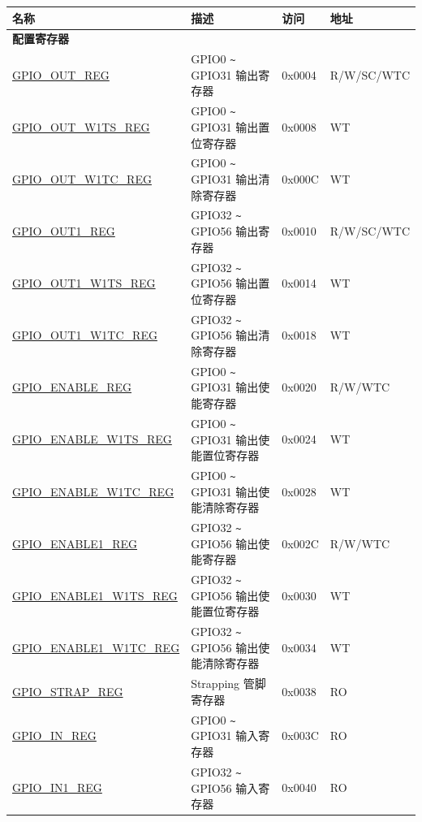 \begin{longtable}{ | p{5.8cm} | p{7.2cm} | p{1.3cm} | p{2.2cm} | }
\hline\rowcolor{lightgray}
\textbf{名称} & \textbf{描述} &  \textbf{访问} & \textbf{地址} \\ \hline
\endhead
\multicolumn{4}{|l|}{\textbf{配置寄存器}} \\ \hline
\hyperref[regdesc:GPIOOUTREG]{GPIO\_OUT\_REG} & GPIO0 \verb+~+ GPIO31 输出寄存器 & 0x0004 & R/W/SC/WTC \\ \hline
\hyperref[regdesc:GPIOOUTW1TSREG]{GPIO\_OUT\_W1TS\_REG} & GPIO0 \verb+~+ GPIO31 输出置位寄存器 & 0x0008 & WT \\ \hline
\hyperref[regdesc:GPIOOUTW1TCREG]{GPIO\_OUT\_W1TC\_REG} & GPIO0 \verb+~+ GPIO31 输出清除寄存器 & 0x000C & WT \\ \hline
\hyperref[regdesc:GPIOOUT1REG]{GPIO\_OUT1\_REG} & GPIO32 \verb+~+ GPIO56 输出寄存器 & 0x0010 & R/W/SC/WTC \\ \hline
\hyperref[regdesc:GPIOOUT1W1TSREG]{GPIO\_OUT1\_W1TS\_REG} & GPIO32 \verb+~+ GPIO56 输出置位寄存器 & 0x0014 & WT \\ \hline
\hyperref[regdesc:GPIOOUT1W1TCREG]{GPIO\_OUT1\_W1TC\_REG} & GPIO32 \verb+~+ GPIO56 输出清除寄存器 & 0x0018 & WT \\ \hline
\hyperref[regdesc:GPIOENABLEREG]{GPIO\_ENABLE\_REG} & GPIO0 \verb+~+ GPIO31 输出使能寄存器 & 0x0020 & R/W/WTC \\ \hline
\hyperref[regdesc:GPIOENABLEW1TSREG]{GPIO\_ENABLE\_W1TS\_REG} & GPIO0 \verb+~+ GPIO31 输出使能置位寄存器 & 0x0024 & WT \\ \hline
\hyperref[regdesc:GPIOENABLEW1TCREG]{GPIO\_ENABLE\_W1TC\_REG} & GPIO0 \verb+~+ GPIO31 输出使能清除寄存器 & 0x0028 & WT \\ \hline
\hyperref[regdesc:GPIOENABLE1REG]{GPIO\_ENABLE1\_REG} & GPIO32 \verb+~+ GPIO56 输出使能寄存器 & 0x002C & R/W/WTC \\ \hline
\hyperref[regdesc:GPIOENABLE1W1TSREG]{GPIO\_ENABLE1\_W1TS\_REG} & GPIO32 \verb+~+ GPIO56 输出使能置位寄存器 & 0x0030 & WT \\ \hline
\hyperref[regdesc:GPIOENABLE1W1TCREG]{GPIO\_ENABLE1\_W1TC\_REG} & GPIO32 \verb+~+ GPIO56 输出使能清除寄存器 & 0x0034 & WT \\ \hline
\hyperref[regdesc:GPIOSTRAPREG]{GPIO\_STRAP\_REG} & Strapping 管脚寄存器 & 0x0038 & RO \\ \hline
\hyperref[regdesc:GPIOINREG]{GPIO\_IN\_REG} & GPIO0 \verb+~+ GPIO31 输入寄存器 & 0x003C & RO \\ \hline
\hyperref[regdesc:GPIOIN1REG]{GPIO\_IN1\_REG} & GPIO32 \verb+~+ GPIO56 输入寄存器 & 0x0040 & RO \\ \hline

\end{longtable}
